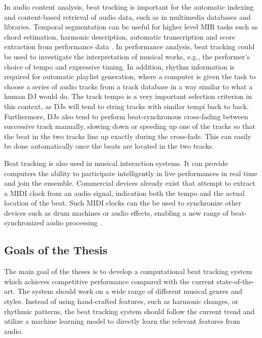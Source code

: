 \documentclass{scrartcl}
\begin{document}

In audio content analysis, beat tracking is important for the automatic indexing and content-based retrieval of audio data, such as in multimedia databases and libraries. Temporal segmentation can be useful for higher level MIR tasks such as chord estimation, harmonic description, automatic transcription and score extraction from performance data \cite{Bello2005b}. In performance analysis, beat tracking could be used to investigate the interpretation of musical works, e.g., the performer's choice of tempo and expressive timing. In addition, rhythm information is required for automatic playlist generation, where a computer is given the task to choose a series of audio tracks from a track database in a way similar to what a human DJ would do. The track tempo is a very important selection criterion in this context, as DJs will tend to string tracks with similar tempi back to back. Furthermore, DJs also tend to perform beat-synchronous cross-fading between successive track manually, slowing down or speeding up one of the tracks so that the beat in the two tracks line up exactly during the cross-fade. This can easily be done automatically once the beats are located in the two tracks.


Beat tracking is also used in musical interaction systems. It can provide computers the ability to participate intelligently in live performances in real time and join the ensemble. Commercial devices already exist that attempt to extract a MIDI clock from an audio signal, indication both the tempo and the actual location of the beat. Such MIDI clocks can the be used to synchronize other devices such as drum machines or audio effects, enabling a new range of beat-synchronized audio processing \cite{Robertson2007}. 
\newpage

\subsection{Goals of the Thesis}

The main goal of the theses is to develop a computational beat tracking system which achieves competitive performance compared with the current state-of-the-art. The system should work on a wide range of different musical genres and styles. Instead of using hand-crafted features, such as harmonic changes, or rhythmic patterns, the beat tracking system should follow the current trend and utilize a machine learning model to directly learn the relevant features from audio. 
\end{document}
